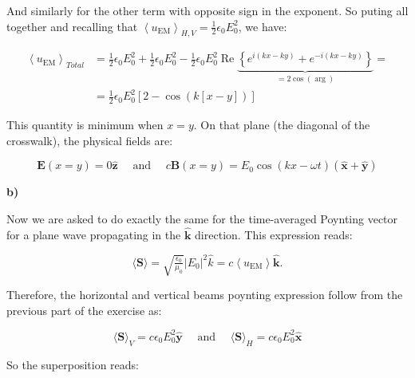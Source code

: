 And similarly for the other term with opposite sign in the exponent. So puting all together and recalling that $\left\langle u_{\mathrm{EM}}\right\rangle_{H, V}=\frac{1}{2} \epsilon_{0} E_{0}^{2}$, we have:
	
\begin{equation}
	\begin{split}
		\left\langle u_{\mathrm{EM}}\right\rangle_{Total}& =\tfrac{1}{2}\epsilon_{0} E_{0}^{2}+\tfrac{1}{2}\epsilon_{0} E_{0}^{2}-\tfrac{1}{2} \epsilon_{0} E_{0}^{2} \operatorname{Re}\underbrace{\left\{e^{i (k x - ky)} + e^{-i(kx- k y)}\right\}}_{=2 \cos(\arg)} =\\
		&=\tfrac{1}{2}\epsilon_{0} E_{0}^{2}\left[2- \cos (k\left[x-y\right])\right]
	\end{split}
\end{equation}

This quantity is minimum when $x=y$. On that plane (the diagonal of the crosswalk), the physical fields are:

\begin{equation}
	\mathbf{E}(x=y)=0 \hat{\mathbf{z}} \quad \text { and } \quad c \mathbf{B}(x=y)=E_{0} \cos (k x-\omega t)(\hat{\mathbf{x}}+\hat{\mathbf{y}})
\end{equation}

\textbf{b)}

Now we are asked to do exactly the same for the time-averaged Poynting vector for a plane wave propagating in the $\hat{\mathbf{k}}$ direction. This expression reads:

\begin{equation}
	\langle\mathbf{S}\rangle= \sqrt{\tfrac{\epsilon_{0}}{\mu_{0}}}|E_{0}|^{2}\hat{k}= c \left\langle u_{\mathrm{EM}}\right\rangle \hat{\mathbf{k}}.
\end{equation}

Therefore, the horizontal and vertical beams poynting expression follow from the previous part of the exercise as:

\begin{equation}
	\langle\mathbf{S}\rangle_{V}= c \epsilon_{0} E_{0}^{2} \hat{\mathbf{y}} \quad \text { and } \quad\langle\mathbf{S}\rangle_{H}= c \epsilon_{0} E_{0}^{2} \hat{\mathbf{x}}
\end{equation}

So the superposition reads:

